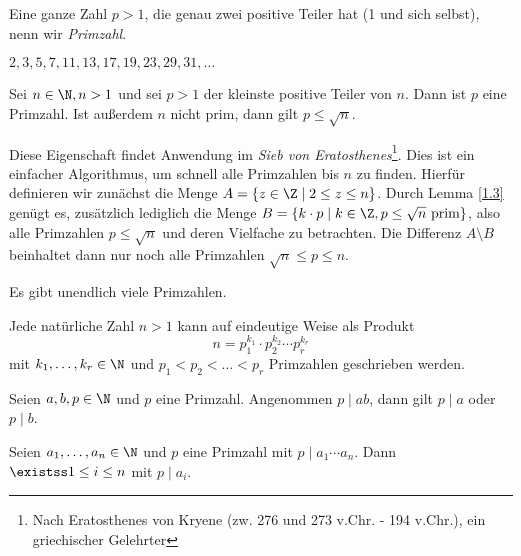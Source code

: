 \begin{defn*}[Primzahl]\video
	Eine ganze Zahl $p > 1$, die genau zwei positive Teiler hat (1 und sich selbst), nenn wir \emph{Primzahl}.
\end{defn*}

\begin{exmp*}
	\( 2,3,5,7,11,13,17,19,23,29,31,\dotsc \)
\end{exmp*}

\begin{lem}\autolabel
	Sei $n \in \N, n > 1$ und sei $p>1$ der kleinste positive Teiler von $n$. Dann ist $p$ eine Primzahl. Ist außerdem $n$ nicht prim, dann gilt $p \leq \sqrt{n}$.
\end{lem}

\begin{rem*}
	Diese Eigenschaft findet Anwendung im \emph{Sieb von Eratosthenes}\footnote{Nach Eratosthenes von Kryene (zw. 276 und 273 v.Chr. - 194 v.Chr.), ein griechischer Gelehrter}. Dies ist ein einfacher Algorithmus, um schnell alle Primzahlen bis $n$ zu finden. Hierfür definieren wir zunächst die Menge \( A = \{z \in \Z \mid 2 \leq z \leq n\} \). Durch Lemma \ref{1.3} genügt es, zusätzlich lediglich die Menge $B = \{k \cdot p \mid k \in \Z, p \leq \sqrt{n} \ \text{prim}\}$, also alle Primzahlen $p \leq \sqrt{n}$ und deren Vielfache zu betrachten. Die Differenz $A \setminus B$ beinhaltet dann nur noch alle Primzahlen $\sqrt{n} \leq p \leq n$.
\end{rem*}

\begin{thm}\autolabel
	Es gibt unendlich viele Primzahlen.
\end{thm}

\begin{thm}\autolabel
	Jede natürliche Zahl $n > 1$ kann auf eindeutige Weise als Produkt
	\[ n = p_1^{k_1} \cdot p_2^{k_2} \dotsm p_r^{k_r} \]
	mit $k_1, \dotsc, k_r \in \N$ und $p_1 < p_2 < \dots < p_r$ Primzahlen geschrieben werden.
\end{thm}

\begin{lem}\video\autolabel
	Seien \( a,b, p \in \N \) und $p$ eine Primzahl. Angenommen $p \mid ab$, dann gilt $p \mid a$ oder $p \mid b$.
\end{lem}

\begin{cor}\autolabel
	Seien $a_1,\dotsc,a_n \in \N$ und $p$ eine Primzahl mit $p \mid a_1 \dotsm a_n$. Dann $\existss 1 \leq i \leq n$ mit $p \mid a_i$.
\end{cor}

